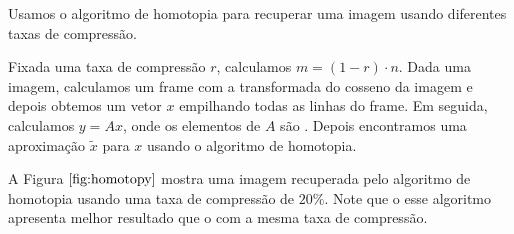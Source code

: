 Usamos o algoritmo de homotopia para recuperar uma imagem usando diferentes taxas de compressão.

Fixada uma taxa de compressão $r$, calculamos $m = (1 - r) \cdot n$. Dada uma imagem, calculamos um frame com a transformada do cosseno da imagem e depois obtemos um vetor $x$ empilhando todas as linhas do frame. Em seguida, calculamos $y = Ax$, onde os elementos de $A$ são . Depois encontramos uma aproximação $\tilde{x}$ para $x$ usando o algoritmo de homotopia.

A Figura $\ref{fig:homotopy}$ mostra uma imagem recuperada pelo algoritmo de homotopia usando uma taxa de compressão de $20\%$. Note que o esse algoritmo apresenta melhor resultado que o  com a mesma taxa de compressão.
